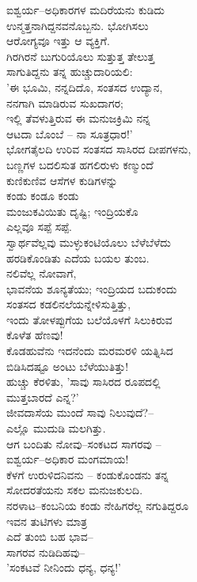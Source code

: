 \begin{myquote}
ಐಶ್ವರ್ಯ–ಅಧಿಕಾರಗಳ ಮದಿರೆಯನು ಕುಡಿದು\\ಉನ್ಮತ್ತನಾಗಿದ್ದನವನೊಬ್ಬನು. ಭೋಗಿಸಲು\\ಆರೋಗ್ಯವೂ ಇತ್ತು ಆ ವ್ಯಕ್ತಿಗೆ.\\ಗಿರಗಿರನೆ ಬುಗುರಿಯೊಲು ಸುತ್ತುತ್ತ ತೇಲುತ್ತ\\ಸಾಗುತಿದ್ದನು ತನ್ನ ಹುಚ್ಚುದಾರಿಯಲಿ:\\'ಈ ಭೂಮಿ, ನನ್ನದಿದೊ, ಸಂತಸದ ಉದ್ಯಾನ,\\ನನಗಾಗಿ ಮಾಡಿರುವ ಸುಖದಾಗರ;\\ಇಲ್ಲಿ ತೆವಳುತ್ತಿರುವ ಈ ಮನುಜಕ್ರಿಮಿ ನನ್ನ\\ಆಟದಾ ಬೊಂಬೆ – ನಾ ಸೂತ್ರಧಾರ!'\\ಭೋಗತೈಲದಿ ಉರಿವ ಸಂತಸದ ಸಾಸಿರದ ದೀಪಗಳನು,\\ಬಣ್ಣಗಳ ಬದಲಿಸುತ ಹಗಲಿರುಳು ಕಣ್ಮುಂದೆ\\ಕುಣಿಕುಣಿವ ಆಸೆಗಳ ಕುಡಿಗಳನ್ನು\\ಕಂಡು ಕಂಡೂ ಕಂಡು\\ಮಂಜುಕವಿಯಿತು ದೃಷ್ಟಿ; ಇಂದ್ರಿಯಕೊ\\ಎಲ್ಲವೂ ಸಪ್ಪೆ ಸಪ್ಪೆ.\\ಸ್ವಾರ್ಥವೆಲ್ಲವು ಮುಳ್ಳುಕಂಟಿಯೊಲು ಬೆಳೆಬೆಳೆದು\\ಹರಡಿಕೊಂಡಿತು ಎದೆಯ ಬಯಲ ತುಂಬ.\\ನಲಿವೆಲ್ಲ ನೋವಾಗೆ,\\ಭಾವನೆಯ ಶೂನ್ಯತೆಯು; ಇಂದ್ರಿಯದ ಬದುಕಂದು\\ಸಂತಸದ ಕಡಲಿನಲೆಯನ್ನೇಳಿಸುತ್ತಿತ್ತು,\\ಇಂದು ತೋಳಪ್ಪುಗೆಯ ಬಲೆಯೊಳಗೆ ಸಿಲುಕಿರುವ\\ಕೊಳೆತ ಹೆಣವು!\\ಕೊಡಹುವೆನು ಇದನೆಂದು ಮರಮರಳಿ ಯತ್ನಿಸಿದ\\ಬಿಡಿಸಿದಷ್ಟೂ ಅಂಟು ಬೆಳೆಯುತಿತ್ತು!\\ಹುಚ್ಚು ಕೆರಳಿತು, 'ಸಾವು ಸಾಸಿರದ ರೂಪದಲ್ಲಿ\\ಮುತ್ತಬಾರದೆ ಎನ್ನ?'\\ಜೀವದಾಸೆಯ ಮುಂದೆ ಸಾವು ನಿಲುವುದೆ?–\\ಎಲ್ಲೊ ಮುದುಡಿ ಮಲಗಿತ್ತು.\\ಆಗ ಬಂದಿತು ನೋವು–ಸಂಕಟದ ಸಾಗರವು –\\ಐಶ್ವರ್ಯ–ಅಧಿಕಾರ ಮಂಗಮಾಯ!\\ಕೆಳಗೆ ಉರುಳಿದನಿವನು – ಕಂಡುಕೊಂಡನು ತನ್ನ\\ಸೋದರತೆಯನು ಸಕಲ ಮನುಜಕುಲದಿ.\\ನರಳಾಟ–ಕಂಬನಿಯ ಕಂಡು ನೇಹಿಗರೆಲ್ಲ ನಗುತಿದ್ದರೂ\\ಇವನ ತುಟಿಗಳು ಮಾತ್ರ\\ಎದೆ ತುಂಬಿ ಬಹ ಭಾವ–\\ಸಾಗರವ ನುಡಿದಿಹವು–\\'ಸಂಕಟವೆ ನೀನಿಂದು ಧನ್ಯ, ಧನ್ಯ!'
\end{myquote}

